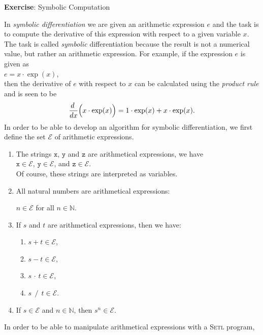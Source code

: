 \documentclass{article}
\newcommand{\diff}{\frac{\displaystyle d\;}{\displaystyle dx}}
\begin{document}
\noindent
{\Large \textbf{Exercise}: Symbolic Computation}
\vspace{0.5cm}

\noindent
In \emph{symbolic differentiation} we are given an arithmetic expression $e$ and the task
is to compute the derivative of this expression with respect to a given variable $x$.
The task is called \emph{symbolic} differentiation because the result is not a numerical
value, but rather an arithmetic expression.  For example, if the expression $e$ is given as
\\[0.2cm]
\hspace*{1.3cm}
$e = x \cdot \exp(x)$,
\\[0.2cm]
then the derivative of $e$ with respect to $x$ can be calculated using the \emph{product rule} and 
is seen to be
\[ \displaystyle \diff \Bigl(x \cdot \exp(x)\Bigr) = 1 \cdot \exp(x) + x \cdot \exp(x). \]
In order to be able to develop an algorithm for symbolic differentiation, we first define the set
 $\mathcal{E}$ of arithmetic expressions.
\begin{enumerate}
\item The strings $\mathtt{x}$, $\mathtt{y}$ and $\mathtt{z}$ are arithmetical expressions, 
      we have
      \\[0.2cm]
      \hspace*{1.3cm}
      $\mathtt{x} \in \mathcal{E}$, \quad
      $\mathtt{y} \in \mathcal{E}$, \quad and \quad
      $\mathtt{z} \in \mathcal{E}$.
      \\[0.2cm]
      Of course, these strings are interpreted as variables.
\item All natural numbers are arithmetical expressions:

      $n \in \mathcal{E}$ \quad for all $n \in \mathbb{N}$.
\item If $s$ and  $t$ are arithmetical expressions, then we have:
      \begin{enumerate}
      \item $s + t \in \mathcal{E}$,
      \item $s - t \in \mathcal{E}$,
      \item $s \,\cdot\, t \in \mathcal{E}$,
      \item $s \;\,/\,\; t \in \mathcal{E}$.
      \end{enumerate}
\item If $s \in \mathcal{E}$ and $n \in \mathbb{N}$, then $s^n \in \mathcal{E}$.  
\end{enumerate}
In order to be able to manipulate arithmetical expressions with a \textsc{Setl} program, 
\end{document}
